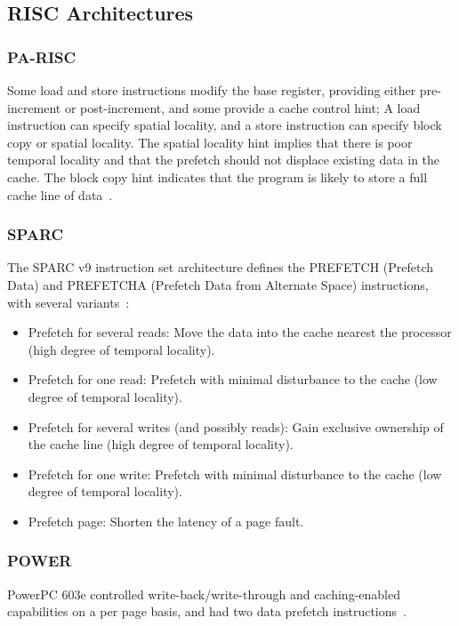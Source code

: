\subsection{RISC Architectures}
\subsubsection{PA-RISC}
Some load and store instructions modify the base register, providing either pre-increment or post-increment, and some provide a cache control hint; A load instruction can specify spatial locality, and a store instruction can specify block copy or spatial locality. The spatial locality hint implies that there is poor temporal locality and that the prefetch should not displace existing data in the cache. The block copy hint indicates that the program is likely to store a full cache line of data~\cite{gccprefetch}.

\subsubsection{SPARC}
The SPARC v9 instruction set architecture defines the PREFETCH (Prefetch Data) and PREFETCHA (Prefetch Data from Alternate Space) instructions, with several variants~\cite{gccprefetch}:
\begin{itemize}
\item Prefetch for several reads: Move the data into the cache nearest the processor (high degree of temporal locality).
\item Prefetch for one read: Prefetch with minimal disturbance to the cache (low degree of temporal locality).
\item Prefetch for several writes (and possibly reads):  Gain exclusive ownership of the cache line (high degree of temporal locality).
\item Prefetch for one write:  Prefetch with minimal disturbance to the cache (low degree of temporal locality).
\item Prefetch page: Shorten the latency of a page fault.
\end{itemize}


\subsubsection{POWER}
PowerPC 603e controlled write-back/write-through and caching-enabled capabilities on a per page basis,
and had two data prefetch instructions~\cite{gccprefetch}.

